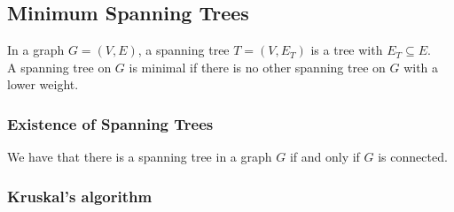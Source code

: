 \subsection{Minimum Spanning Trees}

In a graph $G = (V, E)$, a spanning tree $T = (V, E_T)$ is a tree
with $E_T \subseteq E$.
\\[\baselineskip]
A spanning tree on $G$ is minimal if there is no other spanning tree
on $G$ with a lower weight.

\subsubsection{Existence of Spanning Trees}

We have that there is a spanning tree in a graph $G$ if and only if
$G$ is connected.

\subsubsection{Kruskal's algorithm}

